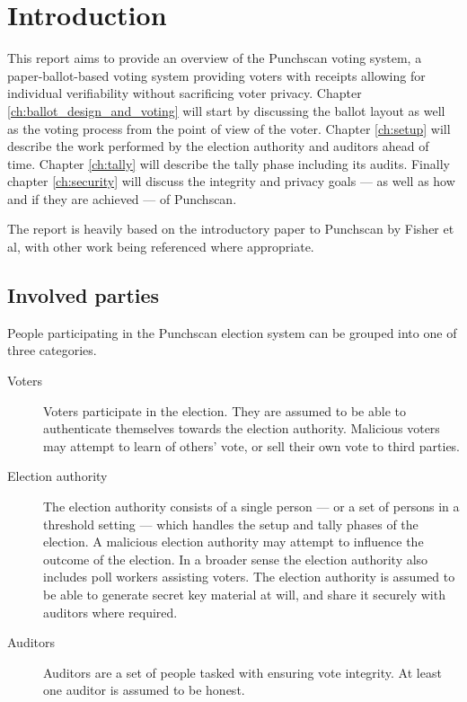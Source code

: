 \chapter{Introduction}
\label{chapter:introduction}

This report aims to provide an overview of the Punchscan voting system, a
paper-ballot-based voting system providing voters with receipts allowing for
individual verifiability without sacrificing voter privacy. Chapter
\ref{ch:ballot_design_and_voting} will start by discussing the ballot layout as
well as the voting process from the point of view of the voter. Chapter
\ref{ch:setup} will describe the work performed by the election authority and
auditors ahead of time. Chapter \ref{ch:tally} will describe the tally phase
including its audits. Finally chapter \ref{ch:security} will discuss the
integrity and privacy goals --- as well as how and if they are achieved --- of
Punchscan. 

The report is heavily based on the introductory paper to Punchscan by Fisher et
al\autocite{fisherPunchscanIntroductionSystem2006}, with other work being
referenced where appropriate.

\section{Involved parties}

People participating in the Punchscan election system can be grouped into one
of three categories.
\begin{description}
\item[Voters] Voters participate in the election. They are assumed to be able
to authenticate themselves towards the election authority. Malicious voters may
attempt to learn of others' vote, or sell their own vote to third parties.
\item[Election authority] The election authority consists of a single person
--- or a set of persons in a threshold setting --- which handles the setup and
tally phases of the election. A malicious election authority may attempt to
influence the outcome of the election. In a broader sense the election
authority also includes poll workers assisting voters. The election authority
is assumed to be able to generate secret key material at will, and share it
securely with auditors where required.
\item[Auditors] Auditors are a set of people tasked with ensuring vote
integrity. At least one auditor is assumed to be honest.
\end{description}

